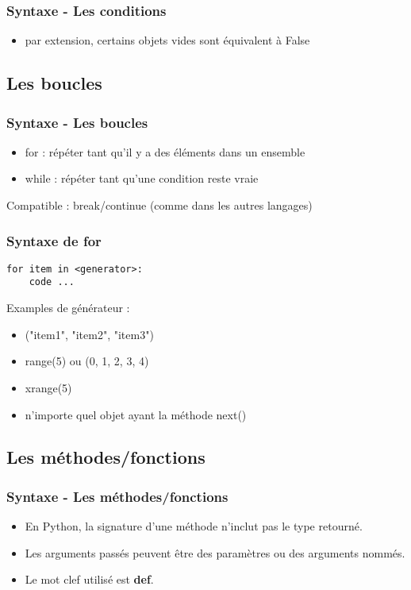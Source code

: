\begin{frame}[fragile]
  \frametitle{Syntaxe - Les conditions}
  \begin{itemize}
    \item par extension, certains objets vides sont équivalent à False
  \end{itemize}
  \begin{ipython}
  \end{ipython}
\end{frame}

\subsection{Les boucles}
\begin{frame}[fragile]
  \frametitle{Syntaxe - Les boucles}
  \begin{itemize}
    \item for : répéter tant qu'il y a des éléments dans un ensemble
    \item while : répéter tant qu'une condition reste vraie
  \end{itemize}

  Compatible : break/continue (comme dans les autres langages)
\end{frame}

\begin{frame}[fragile]
  \frametitle{Syntaxe de for}
  \begin{lstlisting}
for item in <generator>:
    code ...
  \end{lstlisting}
Examples de générateur :
  \begin{itemize}
  \item ("item1", "item2", "item3")
  \item range(5) ou (0, 1, 2, 3, 4)
  \item xrange(5)
  \item n'importe quel objet ayant la méthode next()
  \end{itemize}
\end{frame}

\subsection{Les méthodes/fonctions}
\begin{frame}[fragile]
  \frametitle{Syntaxe - Les méthodes/fonctions}
  \begin{itemize}
    \item En Python, la signature d'une méthode n'inclut pas le type retourné.
    \item Les arguments passés peuvent être des paramètres ou des arguments nommés.
    \item Le mot clef utilisé est {\bf def}.
  \end{itemize}
\end{frame}

